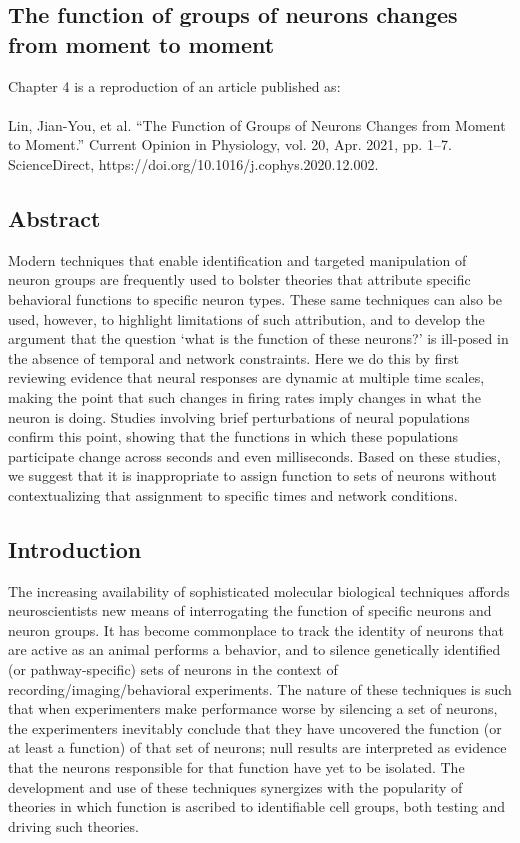 \begin{refsection}

\chapter[Dynamic Function of Neurons]{The function of groups of neurons changes from moment to moment}

Chapter 4 is a reproduction of an article published as:\\\\
Lin, Jian-You, et al. “The Function of Groups of Neurons Changes from Moment to Moment.” Current Opinion in Physiology, vol. 20, Apr. 2021, pp. 1–7. ScienceDirect, https://doi.org/10.1016/j.cophys.2020.12.002.

\section{Abstract}
Modern techniques that enable identification and targeted manipulation of neuron groups are frequently used to bolster theories that attribute specific behavioral functions to specific neuron types. These same techniques can also be used, however, to highlight limitations of such attribution, and to develop the argument that the question ‘what is the function of these neurons?’ is ill-posed in the absence of temporal and network constraints. Here we do this by first reviewing evidence that neural responses are dynamic at multiple time scales, making the point that such changes in firing rates imply changes in what the neuron is doing. Studies involving brief perturbations of neural populations confirm this point, showing that the functions in which these populations participate change across seconds and even milliseconds. Based on these studies, we suggest that it is inappropriate to assign function to sets of neurons without contextualizing that assignment to specific times and network conditions.

\section{Introduction}
The increasing availability of sophisticated molecular biological techniques affords neuroscientists new means of interrogating the function of specific neurons and neuron groups. It has become commonplace to track the identity of neurons that are active as an animal performs a behavior, and to silence genetically identified (or pathway-specific) sets of neurons in the context of recording/imaging/behavioral experiments. The nature of these techniques is such that when experimenters make performance worse by silencing a set of neurons, the experimenters inevitably conclude that they have uncovered the function (or at least a function) of that set of neurons; null results are interpreted as evidence that the neurons responsible for that function have yet to be isolated. The development and use of these techniques synergizes with the popularity of theories in which function is ascribed to identifiable cell groups, both testing and driving such theories.


\end{refsection}
